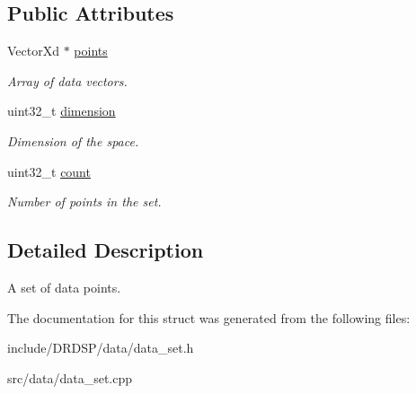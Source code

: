 \subsection*{Public Attributes}
\begin{DoxyCompactItemize}
\item 
\hypertarget{struct_d_r_d_s_p_1_1_data_set_a3b7ec561a02546bc111bd2ad69146cb7}{Vector\-Xd $\ast$ \hyperlink{struct_d_r_d_s_p_1_1_data_set_a3b7ec561a02546bc111bd2ad69146cb7}{points}}\label{struct_d_r_d_s_p_1_1_data_set_a3b7ec561a02546bc111bd2ad69146cb7}

\begin{DoxyCompactList}\small\item\em Array of data vectors. \end{DoxyCompactList}\item 
\hypertarget{struct_d_r_d_s_p_1_1_data_set_aa2598262725329c137e03b8947638780}{uint32\-\_\-t \hyperlink{struct_d_r_d_s_p_1_1_data_set_aa2598262725329c137e03b8947638780}{dimension}}\label{struct_d_r_d_s_p_1_1_data_set_aa2598262725329c137e03b8947638780}

\begin{DoxyCompactList}\small\item\em Dimension of the space. \end{DoxyCompactList}\item 
\hypertarget{struct_d_r_d_s_p_1_1_data_set_a5e6912a9f2017bb2c97840a5d379c882}{uint32\-\_\-t \hyperlink{struct_d_r_d_s_p_1_1_data_set_a5e6912a9f2017bb2c97840a5d379c882}{count}}\label{struct_d_r_d_s_p_1_1_data_set_a5e6912a9f2017bb2c97840a5d379c882}

\begin{DoxyCompactList}\small\item\em Number of points in the set. \end{DoxyCompactList}\end{DoxyCompactItemize}


\subsection{Detailed Description}
A set of data points. 

The documentation for this struct was generated from the following files\-:\begin{DoxyCompactItemize}
\item 
include/\-D\-R\-D\-S\-P/data/data\-\_\-set.\-h\item 
src/data/data\-\_\-set.\-cpp\end{DoxyCompactItemize}
